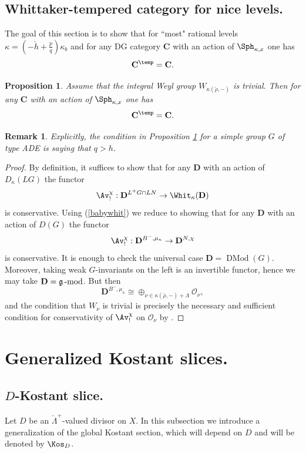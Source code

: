 \documentclass[9pt]{amsart}
\newcommand{\cO}{{\mathcal O}}
\newtheorem{pr}[subsubsection]{Proposition}
\newtheorem{rem}[subsubsection]{Remark}
\numberwithin{equation}{section}
\DeclareMathOperator{\D}{{DMod}}
\begin{document}
\subsection{Whittaker-tempered category for nice levels.}\label{nice}
The goal of this section is to show that for ``most" rational levels $\kappa = (-\check{h} + \frac{p}{q})\kappa_b$ and for any DG category $\mathbf{C}$ with an action of $\Sph_{\kappa, x}$ one has 
$$\mathbf{C}^{\temp} = \mathbf{C}.$$

\begin{pr}\label{nice levels}
	Assume that the integral Weyl group $W_{\kappa(\check{\rho}, -)}$ is trivial. Then for any $\mathbf{C}$ with an action of $\Sph_{\kappa, x}$ one has 
	$$\mathbf{C}^{\temp} = \mathbf{C}.$$
\end{pr}

\begin{rem}
	Explicitly, the condition in Proposition \ref{nice levels} for a simple group $G$ of type ADE is saying that $q  > h$.
\end{rem}

\begin{proof}
	By definition, it suffices to show that for any $\mathbf{D}$ with an action of $D_{\kappa}(LG)$ the functor 
	$$\Av_!^{\chi}: \mathbf{D}^{L^+G \cap LN} \rightarrow \Whit_{\kappa}(\mathbf{D})$$ 
	is conservative. Using (\ref{babywhit}) we reduce to showing that for any $\mathbf{D}$ with an action of $D(G)$ the functor 
	\begin{equation}
	\Av_!^{\chi}: \mathbf{D}^{B^-, \mu_{\kappa}} \rightarrow \mathbf{D}^{N, \chi}
	\end{equation}
	is conservative. It is enough to check the universal case $\mathbf{D} = \D(G)$. Moreover, taking weak $G$-invariants on the left is an invertible functor, hence we may take $\mathbf{D} = \mathfrak{g}\operatorname{{-mod}}$.
	But then $$\mathbf{D}^{B^-, \mu_{\kappa}} \cong \oplus_{\nu \in \kappa(\check{\rho}, -) + \Lambda} \cO_{\nu},$$
	and the condition that $W_{\nu}$ is trivial is precisely the necessary and sufficient condition for conservativity of $\Av_!^{\chi}$ on $\cO_{\nu}$ by \cite{Los}.
\end{proof}

	
	
\section{Generalized Kostant slices.}

\subsection{$D$-Kostant slice.} Let $D$ be an $\check{\Lambda}^+$-valued divisor on $X$. In this subsection  we introduce a generalization of the global Kostant section, which will depend on $D$ and will be denoted by $\Kos_D$. 
\end{document}
